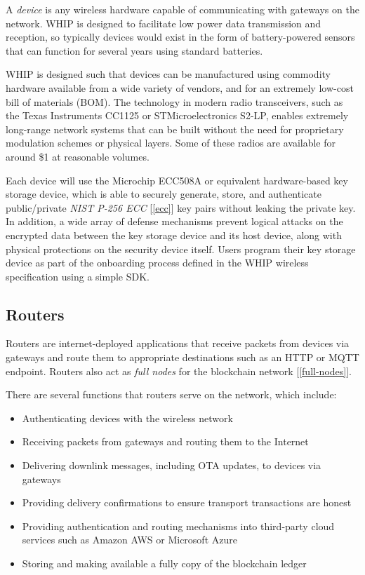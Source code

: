 \documentclass[letterpaper,11pt]{article}
\begin{document}
A \emph{device} is any wireless hardware capable of communicating with gateways on the network. WHIP is designed to facilitate low power data transmission and reception, so typically devices would exist in the form of battery-powered sensors that can function for several years using standard batteries.

WHIP is designed such that devices can be manufactured using commodity hardware available from a wide variety of vendors, and for an extremely low-cost bill of materials (BOM). The technology in modern radio transceivers, such as the Texas Instruments CC1125 or STMicroelectronics S2-LP, enables extremely long-range network systems that can be built without the need for proprietary modulation schemes or physical layers. Some of these radios are available for around \$1 at reasonable volumes.

Each device will use the Microchip ECC508A\cite{ecc} or equivalent hardware-based key storage device, which is able to securely generate, store, and authenticate public/private \emph{NIST P-256 ECC} [\ref{ecc}] key pairs without leaking the private key. In addition, a wide array of defense mechanisms prevent logical attacks on the encrypted data between the key storage device and its host device, along with physical protections on the security device itself. Users program their key storage device as part of the onboarding process defined in the WHIP wireless specification using a simple SDK\@.

\subsection{Routers}

Routers are internet-deployed applications that receive packets from devices via gateways and route them to appropriate destinations such as an HTTP or MQTT endpoint. Routers also act as \emph{full nodes} for the blockchain network [\ref{full-nodes}].

There are several functions that routers serve on the network, which include:

\begin{itemize}
    \item Authenticating devices with the wireless network
    \item Receiving packets from gateways and routing them to the Internet
    \item Delivering downlink messages, including OTA updates, to devices via gateways
    \item Providing delivery confirmations to ensure transport transactions are honest
    \item Providing authentication and routing mechanisms into third-party cloud services such as Amazon AWS or Microsoft Azure
    \item Storing and making available a fully copy of the blockchain ledger
\end{itemize}
\end{document}
